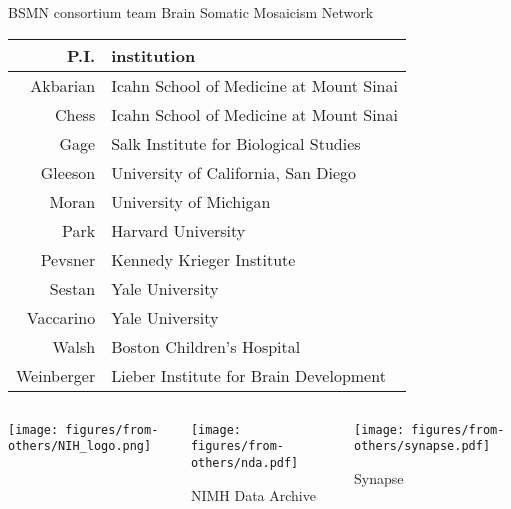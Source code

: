 \documentclass{beamer}
\begin{document}
\begin{frame}{BSMN consortium team}
Brain Somatic Mosaicism Network
\footnotesize
\begin{tabular}{rl}
\hline
P.I. & institution \\
\hline
Akbarian & Icahn School of Medicine at Mount Sinai\\
Chess & Icahn School of Medicine at Mount Sinai\\
Gage & Salk Institute for Biological Studies\\
Gleeson & University of California, San Diego\\
Moran & University of Michigan\\
Park & Harvard University\\
Pevsner & Kennedy Krieger Institute\\
Sestan & Yale University\\
Vaccarino & Yale University\\
Walsh & Boston Children's Hospital\\
Weinberger & Lieber Institute for Brain Development\\
\end{tabular}
\vfill
\begin{columns}[t]
\begin{column}{0.3\textwidth}
\begin{center}

\texttt{[image: figures/from-others/NIH\_logo.png]}
\end{center}
\end{column}

\begin{column}{0.3\textwidth}
\begin{center}

\texttt{[image: figures/from-others/nda.pdf]}

NIMH Data Archive
\end{center}
\end{column}

\begin{column}{0.3\textwidth}
\begin{center}

\texttt{[image: figures/from-others/synapse.pdf]}

Synapse
\end{center}
\end{column}
\end{columns}
\end{frame}
\end{document}
